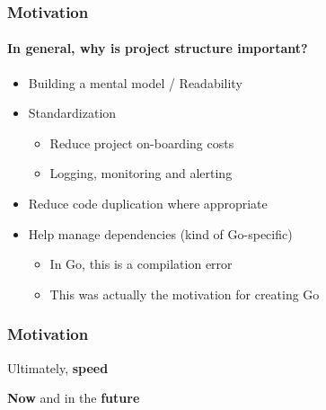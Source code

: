
\begin{frame}
  \frametitle{Motivation}
  \framesubtitle{In general, why is project structure important?}

  \pause
  \begin{itemize}
    \item Building a mental model / Readability
    \pause
    \item Standardization
    \begin{itemize}
      \item Reduce project on-boarding costs
      \item Logging, monitoring and alerting
    \end{itemize}
  \pause
  \item Reduce code duplication where appropriate
  \pause
  \item Help manage dependencies (kind of Go-specific)
    \begin{itemize}
      \item In Go, this is a compilation error
      \item This was actually the motivation for creating Go
    \end{itemize}
  \end{itemize}
\end{frame}

\begin{frame}
  \frametitle{Motivation}
  \centering
  \LARGE
  Ultimately, \textbf{speed}

  \pause
  \vspace{1em}
  \textbf{Now} and in the \textbf{future}
\end{frame}
